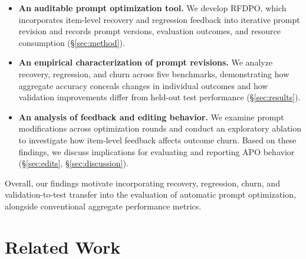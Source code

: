 \documentclass[10pt]{article} %
\begin{document}
\begin{itemize}
\item \textbf{An auditable prompt optimization tool.}
We develop RFDPO, which incorporates item-level recovery and regression feedback into iterative prompt revision and records prompt versions, evaluation outcomes, and resource consumption (\S\ref{sec:method}).

\item \textbf{An empirical characterization of prompt revisions.}
We analyze recovery, regression, and churn across five benchmarks, demonstrating how aggregate accuracy conceals changes in individual outcomes and how validation improvements differ from held-out test performance (\S\ref{sec:results}).

\item \textbf{An analysis of feedback and editing behavior.}
We examine prompt modifications across optimization rounds and conduct an exploratory ablation to investigate how item-level feedback affects outcome churn. Based on these findings, we discuss implications for evaluating and reporting APO behavior (\S\ref{sec:edits}, \S\ref{sec:discussion}).
\end{itemize}

Overall, our findings motivate incorporating recovery, regression, churn, and validation-to-test transfer into the evaluation of automatic prompt optimization, alongside conventional aggregate performance metrics.

\section{Related Work}
\label{sec:related}
\end{document}
